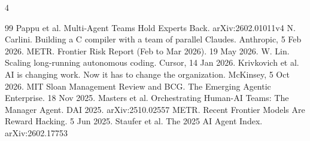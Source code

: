 \documentclass[11pt,letterpaper]{article}
\begin{document}
\begin{multicols}{4}
{\begin{thebibliography}{99}
 Pappu et al. Multi-Agent Teams Hold Experts Back. arXiv:2602.01011v4
 N. Carlini. Building a C compiler with a team of parallel Claudes. Anthropic, 5 Feb 2026.
 METR. Frontier Risk Report (Feb to Mar 2026). 19 May 2026.
 W. Lin. Scaling long-running autonomous coding. Cursor, 14 Jan 2026.
 Krivkovich et al. AI is changing work. Now it has to change the organization. McKinsey, 5 Oct 2026.
 MIT Sloan Management Review and BCG. The Emerging Agentic Enterprise. 18 Nov 2025.
 Masters et al. Orchestrating Human-AI Teams: The Manager Agent. DAI 2025. arXiv:2510.02557
 METR. Recent Frontier Models Are Reward Hacking. 5 Jun 2025.
 Staufer et al. The 2025 AI Agent Index. arXiv:2602.17753
\end{thebibliography}}
\end{multicols}
\end{document}
